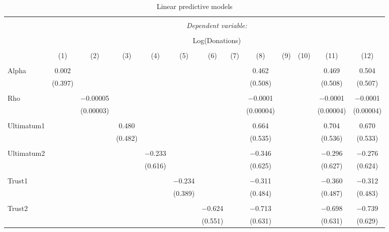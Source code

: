 \documentclass[12pt]{article}
\begin{document}
\begin{table}[!htbp] \centering 
  \caption{Linear predictive models} 
  \label{} 
  \begin{adjustbox}{width=\textwidth}
\begin{tabular}{@{\extracolsep{5pt}}lcccccccccccc} 
\\[-1.8ex]\hline 
\hline \\[-1.8ex] 
 & \multicolumn{12}{c}{\textit{Dependent variable:}} \\ 
\cline{2-13} 
\\[-1.8ex] & \multicolumn{12}{c}{Log(Donations)} \\ 
\\[-1.8ex] & (1) & (2) & (3) & (4) & (5) & (6) & (7) & (8) & (9) & (10) & (11) & (12)\\ 
\hline \\[-1.8ex] 
 Alpha & 0.002 &  &  &  &  &  &  & 0.462 &  &  & 0.469 & 0.504 \\ 
  & (0.397) &  &  &  &  &  &  & (0.508) &  &  & (0.508) & (0.507) \\ 
  & & & & & & & & & & & & \\ 
 Rho &  & $-$0.00005 &  &  &  &  &  & $-$0.0001 &  &  & $-$0.0001 & $-$0.0001 \\ 
  &  & (0.00003) &  &  &  &  &  & (0.00004) &  &  & (0.00004) & (0.00004) \\ 
  & & & & & & & & & & & & \\ 
 Ultimatum1 &  &  & 0.480 &  &  &  &  & 0.664 &  &  & 0.704 & 0.670 \\ 
  &  &  & (0.482) &  &  &  &  & (0.535) &  &  & (0.536) & (0.533) \\ 
  & & & & & & & & & & & & \\ 
 Ultimatum2 &  &  &  & $-$0.233 &  &  &  & $-$0.346 &  &  & $-$0.296 & $-$0.276 \\ 
  &  &  &  & (0.616) &  &  &  & (0.625) &  &  & (0.627) & (0.624) \\ 
  & & & & & & & & & & & & \\ 
 Trust1 &  &  &  &  & $-$0.234 &  &  & $-$0.311 &  &  & $-$0.360 & $-$0.312 \\ 
  &  &  &  &  & (0.389) &  &  & (0.484) &  &  & (0.487) & (0.483) \\ 
  & & & & & & & & & & & & \\ 
 Trust2 &  &  &  &  &  & $-$0.624 &  & $-$0.713 &  &  & $-$0.698 & $-$0.739 \\ 
  &  &  &  &  &  & (0.551) &  & (0.631) &  &  & (0.631) & (0.629) \\ 

\end{tabular}
\end{adjustbox}
\end{table}
\end{document}
